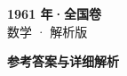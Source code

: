 \documentclass[zihao=-4, a4paper]{ctexart}
\begin{document}
\begin{center}
  {\Large\bfseries 1961 年·全国卷}\\[4pt]
  {\large 数学 · 解析版}
\end{center}
\medskip
{}

\clearpage
{}
\begin{center}{\Large\bfseries 参考答案与详细解析}\end{center}
\medskip

\end{document}
